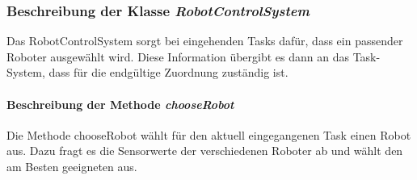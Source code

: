 	\subsubsection{Beschreibung der Klasse \textit{RobotControlSystem}}
		Das RobotControlSystem sorgt bei eingehenden Tasks dafür, dass ein passender Roboter ausgewählt wird. Diese Information übergibt es dann an das Task-System, dass für die endgültige Zuordnung zuständig ist.
	
			\paragraph{Beschreibung der Methode \textit{chooseRobot}}
			Die Methode chooseRobot wählt für den aktuell eingegangenen Task einen Robot aus. Dazu fragt es die Sensorwerte der verschiedenen Roboter ab und wählt den am Besten geeigneten aus.